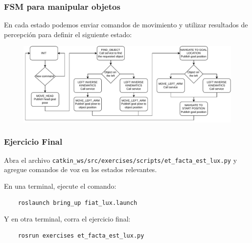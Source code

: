 \begin{frame}\frametitle{FSM para manipular objetos}
  En cada estado podemos enviar comandos de movimiento y utilizar resultados de percepción para definir el siguiente estado:
  \begin{figure}
    \centering
    \includegraphics[width=\textwidth]{Figures/FSM.pdf}
  \end{figure}
\end{frame}

\begin{frame}[containsverbatim]\frametitle{Ejercicio Final}
  Abra el archivo \texttt{catkin\_ws/src/exercises/scripts/et\_facta\_est\_lux.py} y agregue comandos de voz en los estados relevantes.
  
  En una terminal, ejecute el comando:
  \begin{lstlisting}
    roslaunch bring_up fiat_lux.launch
  \end{lstlisting}
  Y en otra terminal, corra el ejercicio final:
  \begin{lstlisting}
    rosrun exercises et_facta_est_lux.py
  \end{lstlisting}
\end{frame}
